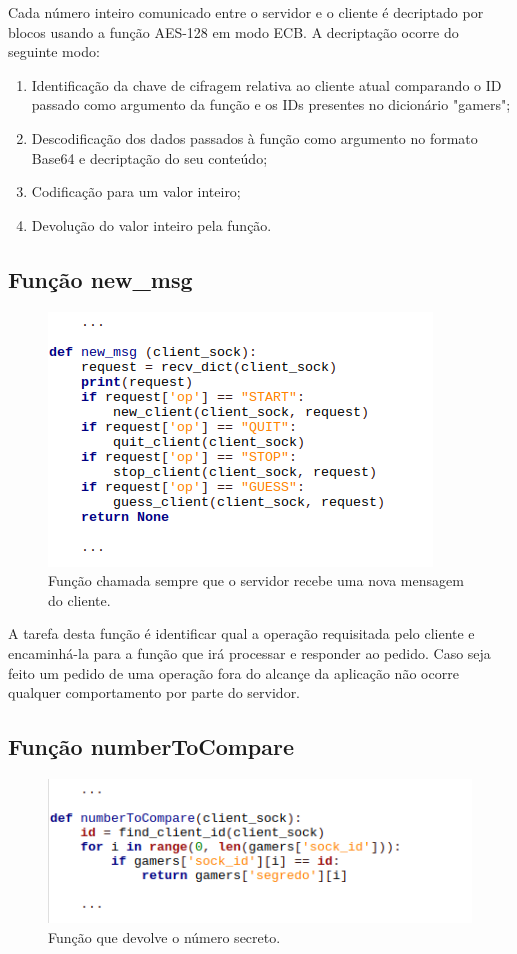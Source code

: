 \documentclass{report}
\begin{document}
Cada número inteiro comunicado entre o servidor e o cliente é decriptado por blocos usando a função AES-128 em modo ECB. A decriptação ocorre do seguinte modo:
\begin{enumerate}
\item Identificação da chave de cifragem relativa ao cliente atual comparando o ID passado como argumento da função e os IDs presentes no dicionário "gamers";
\item Descodificação dos dados passados à função como argumento no formato Base64 e decriptação do seu conteúdo;
\item Codificação para um valor inteiro;
\item Devolução do valor inteiro pela função.
\end{enumerate}

\subsection{Função \textbf{new\_msg}}
\begin{figure}[H]
	\centering
	\includegraphics[scale=0.65]{new_msg}	
	\caption{Função chamada sempre que o servidor recebe uma nova mensagem do cliente.}
\end{figure}

A tarefa desta função é identificar qual a operação requisitada pelo cliente e encaminhá-la para a função que irá processar e responder ao pedido.
Caso seja feito um pedido de uma operação fora do alcançe da aplicação não ocorre qualquer comportamento por parte do servidor.

\subsection{Função \textbf{numberToCompare}}
\begin{figure}[H]
	\centering
	\includegraphics[scale=0.65]{numberToCompare}	
	\caption{Função que devolve o número secreto.}
\end{figure}
\end{document}
